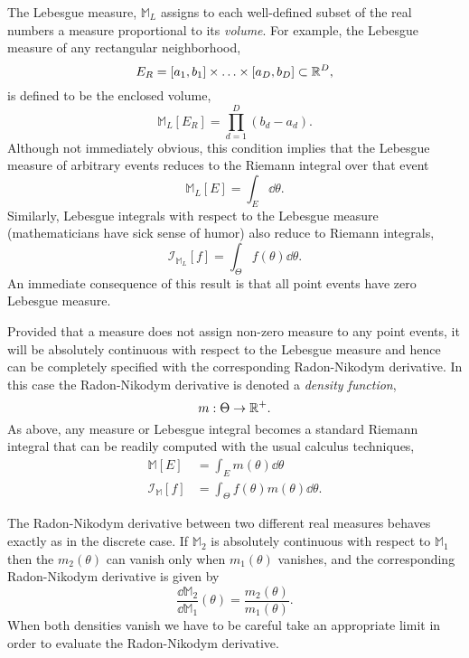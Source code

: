 The Lebesgue measure, $\mathbb{M}_{L}$ assigns to each well-defined 
subset of the real numbers a measure proportional to its \emph{volume}.  
For example, the Lebesgue measure of any rectangular neighborhood, 
%
\begin{equation*}
E_{R} = 
\left[a_{1}, b_{1} \right] \times \ldots \times \left[a_{D}, b_{D} \right] 
\subset \mathbb{R}^{D},
\end{equation*}
%
is defined to be the enclosed volume,
%
\begin{equation*}
\mathbb{M}_{L} \! \left[ E_{R} \right] = 
\prod_{d = 1}^{D} \left(b_{d} - a_{d} \right).  
\end{equation*}
%
Although not immediately obvious, this condition implies that the 
Lebesgue measure of arbitrary events reduces to the Riemann integral 
over that event
%
\begin{equation*}
\mathbb{M}_{L} \! \left[ E \right] = \int_{E} \dd \theta.
\end{equation*}
%
Similarly, Lebesgue integrals with respect to the Lebesgue measure
(mathematicians have sick sense of humor) also reduce to Riemann
integrals,
%
\begin{equation*}
\mathcal{I}_{\mathbb{M}_{L}} \! \left[ f \right]
= \int_{\Theta} f \! \left( \theta \right) \dd \theta.
\end{equation*}
%
An immediate consequence of this result is that all point events
have zero Lebesgue measure.

Provided that a measure does not assign non-zero measure to any
point events, it will be absolutely continuous with respect to the
Lebesgue measure and hence can be completely specified with
the corresponding Radon-Nikodym derivative.  In this case the
Radon-Nikodym derivative is denoted a \emph{density function},
%
\begin{equation*}
m : \Theta \rightarrow \mathbb{R}^{+}.
\end{equation*}
%
As above, any measure or Lebesgue integral becomes a standard
Riemann integral that can be readily computed with the usual
calculus techniques,
%
\begin{align*}
\mathbb{M} \! \left[ E \right]
&=
\int_{E} m \! \left( \theta \right) \dd \theta
\\
\mathcal{I}_{\mathbb{M}} \! \left[ f \right]
&=
\int_{\Theta} f \! \left( \theta \right) m \! \left( \theta \right) \dd \theta.
\end{align*}

The Radon-Nikodym derivative between two different real measures
behaves exactly as in the discrete case.  If $\mathbb{M}_{2}$ is
absolutely continuous with respect to $\mathbb{M}_{1}$ then the
$m_{2} \! \left( \theta \right)$ can vanish only when 
$m_{1} \! \left( \theta \right)$ vanishes, and the corresponding 
Radon-Nikodym derivative is given by
%
\begin{equation*}
\frac{ \dd \mathbb{M}_{2} }{ \dd \mathbb{M}_{1} } \! \left( \theta \right)
=
\frac{ m_{2} \! \left( \theta \right) }{ m_{1} \! \left( \theta \right) }.
\end{equation*}
%
When both densities vanish we have to be careful take an
appropriate limit in order to evaluate the Radon-Nikodym derivative.

